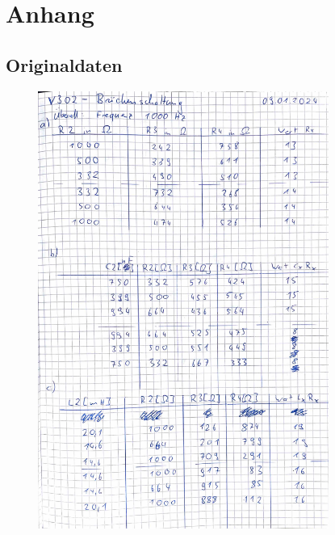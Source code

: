 \section{Anhang}
\label{sec:Anhang}
\subsection{Originaldaten}
\begin{figure}[H]
  \centering
  \includegraphics[width=0.85\textwidth]{Messwerte/Messwerte_1.pdf}
  \label{fig:Messungen_1}
\end{figure}
